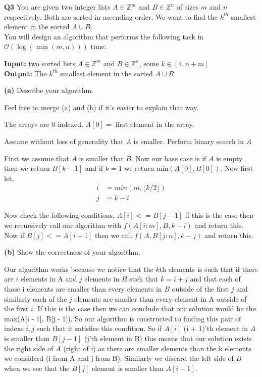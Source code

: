 \documentclass[12pt]{article}
\newcommand{\question}[3][Q]{
\begin{description}
\item \textbf{#1{#2}} #3
\end{description}
}
\newcommand{\hint}[1]{{\footnotesize
    \begin{description}
    [leftmargin=3.3em,style=nextline]
        \item[Hint:] {#1}
    \end{description}}   
}
\newcommand{\note}[1]{{\footnotesize
    \begin{description}
    [leftmargin=3.4em,style=nextline]
        \item[Note:] {#1}
    \end{description}}   
}
\newcommand{\Z}{\mathbb{Z}}
\newcommand{\bigO}{\mathcal{O}}
\begin{document}
\newpage 
\question{3}{
    You are given two integer lists $A \in \Z^{m}$ and $B \in \Z^{n}$ of sizes $m$ and $n$ respectively. Both are sorted in ascending order. We want to find the $k^{th}$ smallest element in the sorted $A \cup B$.\\

    You will design an algorithm that performs the following task in $\bigO(\log(\min(m, n)))$ time:

    \textbf{Input:} two sorted lists $A \in \Z^{m}$ and $B \in \Z^{n}$, some $k \in [1, n + m]$ \\
    \textbf{Output:} The $k^{th}$ smallest element in the sorted $A \cup B$
}

\question[]{(a)}{
    Describe your algorithm.
    \note{Feel free to merge (a) and (b) if it's easier to explain that way.}
    \note{The arrays are $0$-indexed. $A[0]=$ first element in the array.}
    \hint{Assume without loss of generality that $A$ is smaller. Perform binary search in $A$}
}
\begin{answer}
    First we assume that $A$ is smaller that $B$. Now our base case is if  $A$ is empty then  we return $B[k - 1]$ and if $k = 1$ we return min$(A[0], B[0])$. Now first let, 
    \begin{align*}
        i &= min(m, \lfloor k /2 \rfloor)\\
        j &= k - i
    \end{align*}
    
    Now check the following conditions, $A[i] <= B[j - 1]$ if this is the case then we recursively call our algorithm with  $f(A[i:m], B, k - i)$ and return this. Now if  $B[j] <= A[i - 1]$ then we call  $f(A, B[j:n], k - j)$ and return this.
\end{answer}

\question[]{(b)}{
    Show the correctness of your algorithm.
}
\begin{answer}
    Our algorithm works because we notice that the $k$th elements is such that if there are $i$ elements in A and $j$ elements in $B$ such that  $k = i + j$ and that each of those i elements are smaller than every elements in $B$ outside of the first $j$ and similarly each of the $j$ elements are smaller than every element in A outside of the first $i$. If this is the case then we can conclude that our solution would be the max(A[i - 1], B[j - 1]). So our algorithm is constructed to finding this pair of indexs $i,j$ such that it satisfies this condition. So if  $A[i]$ (i + 1)'th element in  $A$ is smaller than $B[j - 1]$ (j'th element in B) this means that our solution exists the right side of  $A$ (right of i) as there are smaller elements than the k elements we considerd (i from A and j from B). Similarly we discard the left side of $B$ when we see that the  $B[j]$ element is smaller than  $A[ i - 1]$.
\end{answer}
\end{document}
